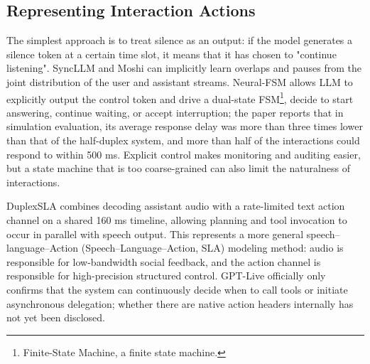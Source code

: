 \documentclass[UTF8,fontset=none,a4paper,10pt]{ctexart}
\begin{document}
\subsection{Representing Interaction Actions}

The simplest approach is to treat silence as an output: if the model generates a silence token at a certain time slot, it means that it has chosen to "continue listening". SyncLLM and Moshi can implicitly learn overlaps and pauses from the joint distribution of the user and assistant streams. Neural-FSM allows LLM to explicitly output the control token and drive a dual-state FSM\footnote{Finite-State Machine, a finite state machine. }, decide to start answering, continue waiting, or accept interruption; the paper reports that in simulation evaluation, its average response delay was more than three times lower than that of the half-duplex system, and more than half of the interactions could respond to \cite{wang2024neuralfsm} within 500 ms. Explicit control makes monitoring and auditing easier, but a state machine that is too coarse-grained can also limit the naturalness of interactions.

DuplexSLA combines decoding assistant audio with a rate-limited text action channel on a shared 160 ms timeline, allowing planning and tool invocation to occur in parallel with speech output\cite{zhang2026duplexsla}. This represents a more general speech--language--Action (Speech--Language--Action, SLA) modeling method: audio is responsible for low-bandwidth social feedback, and the action channel is responsible for high-precision structured control. GPT-Live officially only confirms that the system can continuously decide when to call tools or initiate asynchronous delegation; whether there are native action headers internally has not yet been disclosed.
\end{document}
